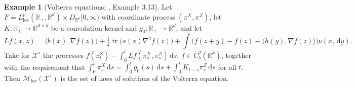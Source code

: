 \documentclass[11pt,a4paper]{article}
\theoremstyle{plain}
\theoremstyle{definition}
\newtheorem{example}[theorem]{Example}
\theoremstyle{remark}
\newcommand{\R}{\mathbb{R}}
\newcommand{\Rp}{\R_+}
\newcommand{\XX}{\mathcal{X}}                  %
\newcommand{\Msol}{\mathcal{M}}
\newcommand{\dif}{\,\mathrm{d}}
\newcommand{\CPS}{\cite{CPS23}}
\begin{document}
\begin{example}[Volterra equations; \CPS, Example 3.13]
  \label{ex:volterra}
  Let $F = L^p_{\mathrm{loc}}(\Rp,\R^d) \times D_{\R^k}[0,\infty)$ with
  coordinate process $(\pi^X,\pi^Z)$, let $K : \Rp \to \R^{d \times k}$ be a
  convolution kernel and $g_0 : \Rp \to \R^d$, and let
  \[
    L f(x,z) = \langle b(x), \nabla f(z) \rangle
      + \tfrac{1}{2}\operatorname{tr}\bigl( a(x) \nabla^2 f(z) \bigr)
      + \int \bigl( f(z+y) - f(z) - \langle h(y), \nabla f(z) \rangle \bigr)
        \nu(x,\dif y) .
  \]
  Take for $\XX^\circ$ the processes
  $f(\pi^Z_t) - \int_0^t Lf(\pi^X_s,\pi^Z_s)\dif s$, $f \in C^2_b(\R^k)$,
  together with the requirement that
  $\int_0^t \pi^X_s \dif s = \int_0^t g_0(s)\dif s + \int_0^t K_{t-s}\pi^Z_s\dif s$
  for all $t$.  Then $\Msol_{\mathrm{loc}}(\XX^\circ)$ is the set of laws of
  solutions of the Volterra equation.


\end{example}
\end{document}
